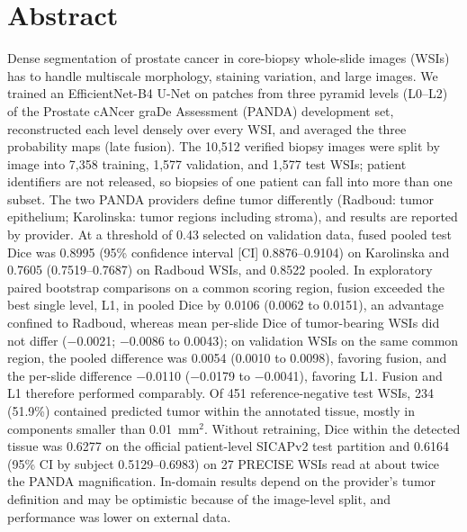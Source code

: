 \documentclass[10pt,letterpaper]{article}
\begin{document}
\section*{Abstract}
Dense segmentation of prostate cancer in core-biopsy whole-slide images (WSIs) has to handle multiscale morphology, staining variation, and large images. We trained an EfficientNet-B4 U-Net on patches from three pyramid levels (L0--L2) of the Prostate cANcer graDe Assessment (PANDA) development set, reconstructed each level densely over every WSI, and averaged the three probability maps (late fusion). The 10,512 verified biopsy images were split by image into 7,358 training, 1,577 validation, and 1,577 test WSIs; patient identifiers are not released, so biopsies of one patient can fall into more than one subset. The two PANDA providers define tumor differently (Radboud: tumor epithelium; Karolinska: tumor regions including stroma), and results are reported by provider. At a threshold of 0.43 selected on validation data, fused pooled test Dice was 0.8995 (95\% confidence interval [CI] 0.8876--0.9104) on Karolinska and 0.7605 (0.7519--0.7687) on Radboud WSIs, and 0.8522 pooled. In exploratory paired bootstrap comparisons on a common scoring region, fusion exceeded the best single level, L1, in pooled Dice by 0.0106 (0.0062 to 0.0151), an advantage confined to Radboud, whereas mean per-slide Dice of tumor-bearing WSIs did not differ ($-$0.0021; $-$0.0086 to 0.0043); on validation WSIs on the same common region, the pooled difference was 0.0054 (0.0010 to 0.0098), favoring fusion, and the per-slide difference $-$0.0110 ($-$0.0179 to $-$0.0041), favoring L1. Fusion and L1 therefore performed comparably. Of 451 reference-negative test WSIs, 234 (51.9\%) contained predicted tumor within the annotated tissue, mostly in components smaller than 0.01~mm$^2$. Without retraining, Dice within the detected tissue was 0.6277 on the official patient-level SICAPv2 test partition and 0.6164 (95\% CI by subject 0.5129--0.6983) on 27 PRECISE WSIs read at about twice the PANDA magnification. In-domain results depend on the provider's tumor definition and may be optimistic because of the image-level split, and performance was lower on external data.

\linenumbers
\end{document}
